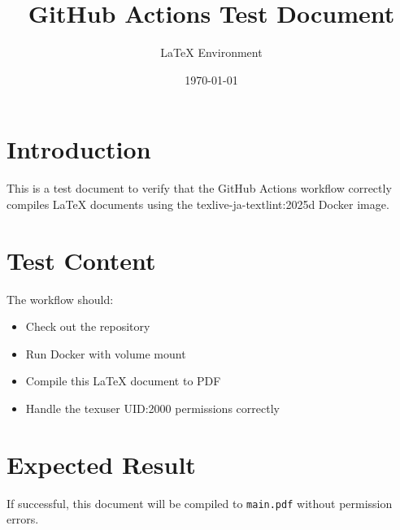 \documentclass{article}
\title{GitHub Actions Test Document}
\author{LaTeX Environment}
\date{\today}
\begin{document}
\maketitle

\section{Introduction}
This is a test document to verify that the GitHub Actions workflow correctly compiles LaTeX documents using the texlive-ja-textlint:2025d Docker image.

\section{Test Content}
The workflow should:
\begin{itemize}
    \item Check out the repository
    \item Run Docker with volume mount
    \item Compile this LaTeX document to PDF
    \item Handle the texuser UID:2000 permissions correctly
\end{itemize}

\section{Expected Result}
If successful, this document will be compiled to \texttt{main.pdf} without permission errors.
\end{document}
